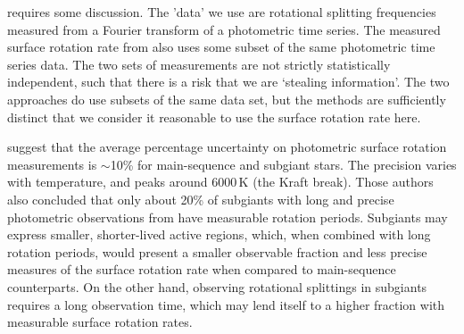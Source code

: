 
requires some discussion. The 'data' we use are rotational splitting frequencies measured from a Fourier transform of a photometric time series. The measured surface rotation rate from \citet{garcia_rotation_2014} also uses some subset of the same photometric time series data. The two sets of measurements are not strictly statistically independent, such that there is a risk that we are `stealing information'. The two approaches do use subsets of the same data set, but the methods are sufficiently distinct that we consider it reasonable to use the surface rotation rate here. 

\citet{santos_surface_2021} suggest that the average percentage uncertainty on photometric surface rotation measurements is $\sim$10\% for main-sequence and subgiant stars. The precision varies with temperature, and peaks around 6000\,K (the Kraft break). Those authors also concluded that only about 20\% of subgiants with long and precise photometric observations from \kepler{} have measurable rotation periods. Subgiants may express smaller, shorter-lived active regions, which, when combined with long rotation periods, would present a smaller observable fraction and less precise measures of the surface rotation rate when compared to main-sequence counterparts. On the other hand, observing rotational splittings in subgiants requires a long observation time, which may lend itself to a higher fraction with measurable surface rotation rates. 

